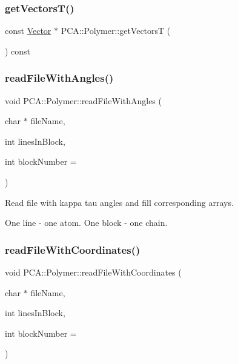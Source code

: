 \hypertarget{class_p_c_a_1_1_polymer_a83c92fb07eafc88d121ef4b4124319c3}{}\label{class_p_c_a_1_1_polymer_a83c92fb07eafc88d121ef4b4124319c3} 
\subsubsection{\texorpdfstring{get\+Vectors\+T()}{getVectorsT()}}
{\footnotesize\ttfamily const \hyperlink{class_p_c_a_1_1_vector}{Vector} $\ast$ P\+C\+A\+::\+Polymer\+::get\+VectorsT (\begin{DoxyParamCaption}{ }\end{DoxyParamCaption}) const}

\hypertarget{class_p_c_a_1_1_polymer_a3e498b6e57d98c9cc4d07a7aedb4b6a5}{}\label{class_p_c_a_1_1_polymer_a3e498b6e57d98c9cc4d07a7aedb4b6a5} 
\subsubsection{\texorpdfstring{read\+File\+With\+Angles()}{readFileWithAngles()}}
{\footnotesize\ttfamily void P\+C\+A\+::\+Polymer\+::read\+File\+With\+Angles (\begin{DoxyParamCaption}\item[{char $\ast$}]{file\+Name,  }\item[{int}]{lines\+In\+Block,  }\item[{int}]{block\+Number = {} }\end{DoxyParamCaption})\hspace{0.3cm}{\ttfamily [protected]}}



Read file with kappa tau angles and fill corresponding arrays. 

One line -\/ one atom. One block -\/ one chain. \hypertarget{class_p_c_a_1_1_polymer_a777691bb321ef1da30a064757eb480c7}{}\label{class_p_c_a_1_1_polymer_a777691bb321ef1da30a064757eb480c7} 
\subsubsection{\texorpdfstring{read\+File\+With\+Coordinates()}{readFileWithCoordinates()}}
{\footnotesize\ttfamily void P\+C\+A\+::\+Polymer\+::read\+File\+With\+Coordinates (\begin{DoxyParamCaption}\item[{char $\ast$}]{file\+Name,  }\item[{int}]{lines\+In\+Block,  }\item[{int}]{block\+Number = {} }\end{DoxyParamCaption})\hspace{0.3cm}{\ttfamily [protected]}}



